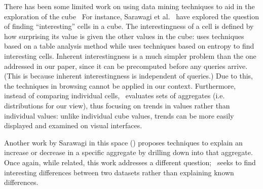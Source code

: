 There has been some limited work on using data mining techniques
to aid in the exploration of the 
cube~\cite{DBLP:conf/vldb/Sarawagi99, DBLP:conf/vldb/SatheS01, DBLP:conf/vldb/Sarawagi00, 
DBLP:conf/SIGKDD/OrdonezC09}
For instance, Sarawagi et al.~\cite{DBLP:conf/EDBT/SarawagiAM98, DBLP:conf/vldb/Sarawagi00} 
have explored 
the question of finding ``interesting'' cells in a cube.
The interestingness of a cell is defined by how surprising
its value is given the other values in the cube:
\cite{DBLP:conf/EDBT/SarawagiAM98} uses techniques 
based on a table analysis method while
\cite{DBLP:conf/vldb/Sarawagi00} uses techniques based on entropy to find interesting cells.
Inherent interestingness is a much simpler problem than the
one addressed in our paper, since it can be precomputed before
any queries arrive. (This is because inherent interestingness is independent of queries.) 
Due to this, 
the techniques in browsing \cite{DBLP:conf/EDBT/SarawagiAM98, 
DBLP:conf/vldb/Sarawagi00} cannot be applied in our context.
Furthermore, instead of comparing individual cells, 
\SeeDB\ evaluates sets of aggregates (i.e. distributions
for our view), thus focusing on trends in values rather than individual values:
unlike individual cube values, trends can be more easily displayed
and examined on visual interfaces.

Another work by Sarawagi in this space (\cite{DBLP:conf/vldb/Sarawagi99}) 
proposes techniques to explain an
increase or decrease in a specific aggregate by drilling down into that aggregate.
Once again, while related, 
this work addresses a different question; \SeeDB\ seeks to find interesting
differences between two datasets rather than explaining known differences. 




